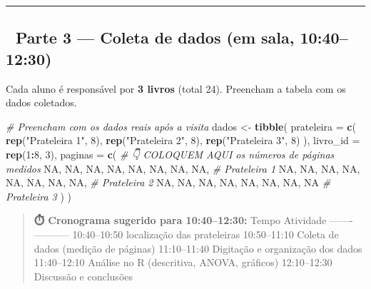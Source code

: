 \documentclass[
]{article}
\newenvironment{Shaded}{\begin{snugshade}}{\end{snugshade}}
\newcommand{\AttributeTok}[1]{\textcolor[rgb]{0.13,0.29,0.53}{#1}}
\newcommand{\CommentTok}[1]{\textcolor[rgb]{0.56,0.35,0.01}{\textit{#1}}}
\newcommand{\ConstantTok}[1]{\textcolor[rgb]{0.56,0.35,0.01}{#1}}
\newcommand{\DecValTok}[1]{\textcolor[rgb]{0.00,0.00,0.81}{#1}}
\newcommand{\FunctionTok}[1]{\textcolor[rgb]{0.13,0.29,0.53}{\textbf{#1}}}
\newcommand{\NormalTok}[1]{#1}
\newcommand{\OtherTok}[1]{\textcolor[rgb]{0.56,0.35,0.01}{#1}}
\newcommand{\SpecialCharTok}[1]{\textcolor[rgb]{0.81,0.36,0.00}{\textbf{#1}}}
\newcommand{\StringTok}[1]{\textcolor[rgb]{0.31,0.60,0.02}{#1}}
\begin{document}
\begin{center}\rule{0.5\linewidth}{0.5pt}\end{center}

\subsection{📝 Parte 3 --- Coleta de dados (em sala,
10:40--12:30)}\label{parte-3-coleta-de-dados-em-sala-10401230}

Cada aluno é responsável por \textbf{3 livros} (total 24). Preencham a
tabela com os dados coletados.

\begin{Shaded}
\begin{Highlighting}[]
\CommentTok{\# Preencham com os dados reais após a visita}
\NormalTok{dados }\OtherTok{\textless{}{-}} \FunctionTok{tibble}\NormalTok{(}
  \AttributeTok{prateleira =} \FunctionTok{c}\NormalTok{(}
    \FunctionTok{rep}\NormalTok{(}\StringTok{"Prateleira 1"}\NormalTok{, }\DecValTok{8}\NormalTok{),}
    \FunctionTok{rep}\NormalTok{(}\StringTok{"Prateleira 2"}\NormalTok{, }\DecValTok{8}\NormalTok{),}
    \FunctionTok{rep}\NormalTok{(}\StringTok{"Prateleira 3"}\NormalTok{, }\DecValTok{8}\NormalTok{)}
\NormalTok{  ),}
  \AttributeTok{livro\_id =} \FunctionTok{rep}\NormalTok{(}\DecValTok{1}\SpecialCharTok{:}\DecValTok{8}\NormalTok{, }\DecValTok{3}\NormalTok{),}
  \AttributeTok{paginas =} \FunctionTok{c}\NormalTok{(}
    \CommentTok{\# 👇 COLOQUEM AQUI os números de páginas medidos}
    \ConstantTok{NA}\NormalTok{, }\ConstantTok{NA}\NormalTok{, }\ConstantTok{NA}\NormalTok{, }\ConstantTok{NA}\NormalTok{, }\ConstantTok{NA}\NormalTok{, }\ConstantTok{NA}\NormalTok{, }\ConstantTok{NA}\NormalTok{, }\ConstantTok{NA}\NormalTok{,   }\CommentTok{\# Prateleira 1}
    \ConstantTok{NA}\NormalTok{, }\ConstantTok{NA}\NormalTok{, }\ConstantTok{NA}\NormalTok{, }\ConstantTok{NA}\NormalTok{, }\ConstantTok{NA}\NormalTok{, }\ConstantTok{NA}\NormalTok{, }\ConstantTok{NA}\NormalTok{, }\ConstantTok{NA}\NormalTok{,   }\CommentTok{\# Prateleira 2}
    \ConstantTok{NA}\NormalTok{, }\ConstantTok{NA}\NormalTok{, }\ConstantTok{NA}\NormalTok{, }\ConstantTok{NA}\NormalTok{, }\ConstantTok{NA}\NormalTok{, }\ConstantTok{NA}\NormalTok{, }\ConstantTok{NA}\NormalTok{, }\ConstantTok{NA}    \CommentTok{\# Prateleira 3}
\NormalTok{  )}
\NormalTok{)}
\end{Highlighting}
\end{Shaded}

\begin{quote}
\textbf{⏱️ Cronograma sugerido para 10:40--12:30:} \textbar{} Tempo
\textbar{} Atividade \textbar{}
\textbar-------\textbar-----------\textbar{} \textbar{} 10:40--10:50
\textbar{} localização das prateleiras \textbar{} \textbar{}
10:50--11:10 \textbar{} Coleta de dados (medição de páginas) \textbar{}
\textbar{} 11:10--11:40 \textbar{} Digitação e organização dos dados
\textbar{} \textbar{} 11:40--12:10 \textbar{} Análise no R (descritiva,
ANOVA, gráficos) \textbar{} \textbar{} 12:10--12:30 \textbar{} Discussão
e conclusões \textbar{}
\end{quote}
\end{document}
